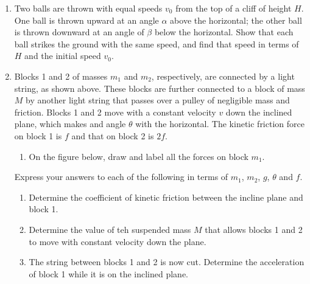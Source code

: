 \documentclass{../../../oss-apphys}
\begin{document}
\begin{enumerate}[leftmargin=15pt]

\item Two balls are thrown with equal speeds $v_0$ from the top of a cliff of
  height $H$. One ball is thrown upward at an angle $\alpha$ above the
  horizontal; the other ball is thrown downward at an angle of $\beta$ below
  the horizontal. Show that each ball strikes the ground with the same speed,
  and find that speed in terms of $H$ and the initial speed $v_0$.
  \vspace{2in}
  \newpage

\item Blocks 1 and 2 of masses $m_1$ and $m_2$, respectively, are connected by a
  light string, as shown above. These blocks are further connected to a block of
  mass $M$ by another light string that passes over a pulley of negligible mass
  and friction. Blocks 1 and 2 move with a constant velocity $v$ down the inclined
  plane, which makes and angle $\theta$ with the horizontal. The kinetic friction
  force on block 1 is $f$ and that on block 2 is $2f$.
  \begin{enumerate}[leftmargin=18pt,topsep=0pt,noitemsep]
  \item On the figure below, draw and label all the forces on block $m_1$.
  \end{enumerate}
  Express your answers to each of the following in terms of $m_1$, $m_2$, $g$,
  $\theta$ and $f$.
  \begin{enumerate}[leftmargin=18pt,topsep=0pt,noitemsep,resume]
  \item Determine the coefficient of kinetic friction between the incline plane
    and block 1.
  \item Determine the value of teh suspended mass $M$ that allows blocks 1 and 2
  to move with constant velocity down the plane.
  \item The string between blocks 1 and 2 is now cut. Determine the acceleration of
    block 1 while it is on the inclined plane.
  \end{enumerate}
  \newpage
  

\end{enumerate}
\end{document}
